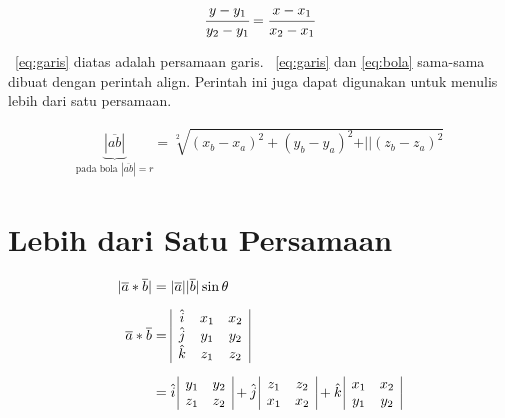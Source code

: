     \noindent \begin{align}\label{eq:garis}
        \cfrac{y - y_{1}}{y_{2} - y_{1}} =
        \cfrac{x - x_{1}}{x_{2} - x_{1}}
    \end{align}

    \equ~\ref{eq:garis} diatas adalah persamaan garis.
    \equ~\ref{eq:garis} dan \ref{eq:bola} sama-sama dibuat dengan perintah \bslash
    align.
    Perintah ini juga dapat digunakan untuk menulis lebih dari satu persamaan.

    \noindent \begin{align}\label{eq:bola}
        \underbrace{|\overline{ab}|}_{\text{pada bola $|\overline{ab}| = r$}}
        = \sqrt[2]{(x_{b} - x_{a})^{2} + (y_{b} - y_{a})^{2} +
            \vert\vert(z_{b} - z_{a})^{2}}
    \end{align}

    \section{Lebih dari Satu Persamaan}
    \label{sec:multiEqu}
    \noindent \begin{align}\label{eq:matriks}
        |\overline{a} * \overline{b}| & = |\overline{a}| |\overline{b}| \sin\theta
        \\[0.2cm]
        \overline{a} * \overline{b}   & =
        \begin{array}{| c c c |}
            \hat{i} & x_{1} & x_{2} \\
            \hat{j} & y_{1} & y_{2} \\
            \hat{k} & z_{1} & z_{2} \\
        \end{array} \nonumber                                                    \\[0.2cm]
                                      & = \hat{i} \,
        \begin{array}{ | c c | }
            y_{1} & y_{2} \\
            z_{1} & z_{2} \\
        \end{array}
        + \hat{j} \,
        \begin{array}{ | c c | }
            z_{1} & z_{2} \\
            x_{1} & x_{2} \\
        \end{array}
        + \hat{k} \,
        \begin{array}{ | c c | }
            x_{1} & x_{2} \\
            y_{1} & y_{2} \\
        \end{array}
        \nonumber
    \end{align}


